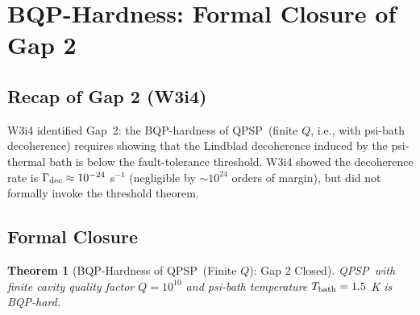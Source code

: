 \documentclass[11pt]{article}
\newtheorem{theorem}{Theorem}[section]
\theoremstyle{definition}
\theoremstyle{remark}
\newcommand{\QPSP}{\textsc{QPSP}}
\begin{document}
\section{BQP-Hardness: Formal Closure of Gap 2}
\label{sec:gap2_closure}

\subsection{Recap of Gap 2 (W3i4)}

W3i4 identified Gap~2: the BQP-hardness of \QPSP\ (finite $Q$, i.e.,
with psi-bath decoherence) requires showing that the Lindblad decoherence
induced by the psi-thermal bath is below the fault-tolerance threshold.
W3i4 showed the decoherence rate is $\Gamma_{\rm dec} \approx 10^{-24}$
s$^{-1}$ (negligible by $\sim 10^{24}$ orders of margin), but did not
formally invoke the threshold theorem.

\subsection{Formal Closure}

\begin{theorem}[BQP-Hardness of \QPSP\ (Finite $Q$): Gap 2 Closed]
\label{thm:gap2_closed}
\QPSP\ with finite cavity quality factor $Q = 10^{10}$ and psi-bath
temperature $T_{\rm bath} = 1.5$ K is BQP-hard.
\end{theorem}
\end{document}
